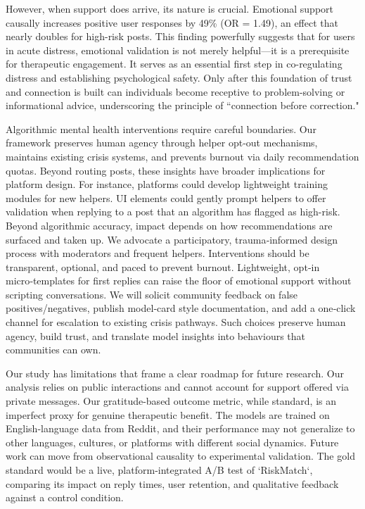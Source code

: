 \documentclass[letterpaper]{article} %
\begin{document}
However, when support does arrive, its nature is crucial. Emotional support causally increases positive user responses by 49\% (OR = 1.49), an effect that nearly doubles for high-risk posts. This finding powerfully suggests that for users in acute distress, emotional validation is not merely helpful—it is a prerequisite for therapeutic engagement. It serves as an essential first step in co-regulating distress and establishing psychological safety. Only after this foundation of trust and connection is built can individuals become receptive to problem-solving or informational advice, underscoring the principle of ``connection before correction."

Algorithmic mental health interventions require careful boundaries. Our framework preserves human agency through helper opt-out mechanisms, maintains existing crisis systems, and prevents burnout via daily recommendation quotas. Beyond routing posts, these insights have broader implications for platform design. For instance, platforms could develop lightweight training modules for new helpers. UI elements could gently prompt helpers to offer validation when replying to a post that an algorithm has flagged as high-risk. Beyond algorithmic accuracy, impact depends on how recommendations are surfaced and taken up. We advocate a participatory, trauma‑informed design process with moderators and frequent helpers. Interventions should be transparent, optional, and paced to prevent burnout. Lightweight, opt‑in micro‑templates for first replies can raise the floor of emotional support without scripting conversations. We will solicit community feedback on false positives/negatives, publish model‑card style documentation, and add a one‑click channel for escalation to existing crisis pathways. Such choices preserve human agency, build trust, and translate model insights into behaviours that communities can own.

Our study has limitations that frame a clear roadmap for future research. Our analysis relies on public interactions and cannot account for support offered via private messages. Our gratitude-based outcome metric, while standard, is an imperfect proxy for genuine therapeutic benefit. The models are trained on English-language data from Reddit, and their performance may not generalize to other languages, cultures, or platforms with different social dynamics. Future work can move from observational causality to experimental validation. The gold standard would be a live, platform-integrated A/B test of `RiskMatch`, comparing its impact on reply times, user retention, and qualitative feedback against a control condition. 
\end{document}

